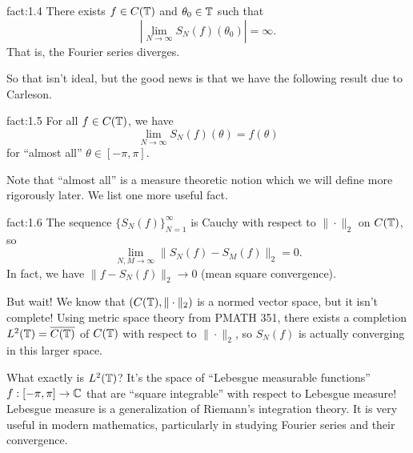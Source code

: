 \begin{fact}{fact:1.4}
    There exists $f \in C(\mathbb{T})$ and $\theta_0 \in \mathbb{T}$ such that 
    \[ \left| \lim_{N\to\infty} S_N(f)(\theta_0) \right| = \infty. \] 
    That is, the Fourier series diverges.
\end{fact} 

So that isn't ideal, but the good news is that we have the following 
result due to Carleson.

\begin{fact}[Carleson]{fact:1.5}
    For all $f \in C(\mathbb{T})$, we have 
    \[ \lim_{N\to\infty} S_N(f)(\theta) = f(\theta) \] 
    for ``almost all'' $\theta \in [-\pi, \pi]$. 
\end{fact} 

Note that ``almost all'' is a measure theoretic notion which we will define 
more rigorously later. We list one more useful fact. 

\begin{fact}{fact:1.6}
    The sequence $\{S_N(f)\}_{N=1}^\infty$ is Cauchy with respect to 
    $\|\cdot\|_2$ on $C(\mathbb{T})$, so 
    \[ \lim_{N,M\to\infty} \|S_N(f) - S_M(f)\|_2 = 0. \] 
    In fact, we have $\|f - S_N(f)\|_2 \to 0$ (mean square convergence). 
\end{fact} 

But wait! We know that $(C(\mathbb{T}), \|\cdot\|_2)$ is a normed vector space, 
but it isn't complete! Using metric space theory from PMATH 351, there 
exists a completion $L^2(\mathbb{T}) = \overline{C(\mathbb{T})}$ of $C(\mathbb{T})$ with respect to 
$\|\cdot\|_2$, so $S_N(f)$ is actually converging in this larger space. 

What exactly is $L^2(\mathbb{T})$? It's the space of ``Lebesgue measurable functions''
$f : [-\pi, \pi] \to \mathbb{C}$ that are ``square integrable'' with respect to 
Lebesgue measure! Lebesgue measure is a generalization of Riemann's 
integration theory. It is very useful in modern mathematics, particularly 
in studying Fourier series and their convergence. 

